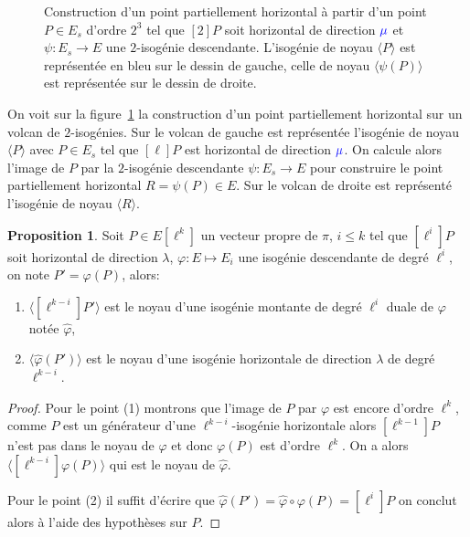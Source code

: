 \documentclass[10pt,a4paper]{book}
\theoremstyle{plain}
\theoremstyle{definition}
\theoremstyle{definition}
\theoremstyle{definition}
\newtheorem{prop}[thm]{Proposition}
\theoremstyle{definition}
\theoremstyle{remark}
\theoremstyle{remark}
\theoremstyle{definition}
\begin{document}
\begin{figure}
\begin{center}
\begin{tikzpicture}[scale=0.50]
\end{tikzpicture}
\end{center}
\caption{ \label{fig:par:hor:con} Construction d'un point partiellement 
horizontal à partir d'un point $P \in E_s$ d'ordre $2^3$ tel que $[2]P$ soit 
horizontal de direction $\color{blue}{\mu}$ et $\psi:E_s \rightarrow E$ une 
$2$-isogénie descendante. L'isogénie de noyau $\langle P \rangle$ est 
représentée en bleu sur le dessin de gauche, celle de noyau $\langle \psi(P) 
\rangle$ est représentée sur le dessin de droite.}
\end{figure}

On voit sur la figure~\ref{fig:par:hor:con} la construction d'un point 
partiellement horizontal sur un volcan de $2$-isogénies. Sur le volcan de 
gauche est représentée l'isogénie de noyau $\langle P \rangle$ avec $P \in E_s$
tel que $[\ell]P$ est horizontal de direction  $\color{blue}{\mu}$. On calcule 
alors l'image de $P$ par la $2$-isogénie descendante $\psi:E_s \rightarrow E$
pour construire le point partiellement horizontal $R=\psi(P) \in E$. Sur le 
volcan de droite est représenté l'isogénie de noyau $\langle R \rangle$.

\begin{prop}
\label{pro:elk:par:hor}
Soit $P \in E[\ell^k]$ un vecteur propre de $\pi$, $i\leqslant k$ tel que 
$[\ell^i]P$ soit horizontal de direction $\lambda$, $\varphi:E \mapsto E_i$ une
isogénie descendante de degré $\ell^i$, on note $P'=\varphi(P)$, alors:
\begin{enumerate}
\item  $\langle [\ell^{k-i}]P' \rangle$ est le noyau d'une isogénie montante de
degré $\ell^{i}$ duale de $\varphi$ notée $\widehat{\varphi}$, 
\item  $\langle \widehat{\varphi}(P') \rangle$ est le noyau d'une isogénie 
horizontale de direction $\lambda$ de degré $\ell^{k-i}$.  
\end{enumerate}
\end{prop}

\begin{proof}
Pour le point (1) montrons que l'image de $P$ par $\varphi$ est encore d'ordre 
$\ell^k$, comme $P$ est un générateur d'une $\ell^{k-i}$-isogénie horizontale 
alors $[\ell^{k-1}]P$ n'est pas dans le noyau de $\varphi$ et donc $\varphi(P)$ est 
d'ordre $\ell^k$. On a alors $\langle [\ell^{k-i}]\varphi(P) \rangle $ qui est le 
noyau de $\widehat{\varphi}$.  

Pour le point (2) il suffit d'écrire que $\widehat{\varphi}(P')=\widehat{\varphi}\circ \varphi (P)= [\ell^i] P$ on conclut alors à l'aide des hypothèses sur $P$.
\end{proof}
\end{document}
